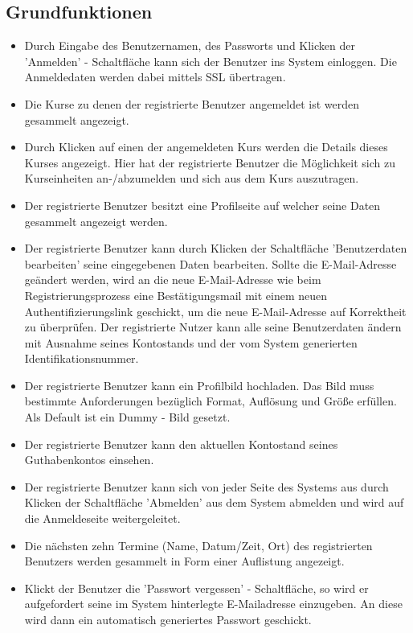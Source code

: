 \documentclass[a4paper]{scrreprt}
\begin{document}
		\subsection{Grundfunktionen}
			\begin{itemize}
				\item {}
					Durch Eingabe des Benutzernamen, des Passworts und Klicken der 'Anmelden' - Schaltfläche kann sich der Benutzer ins System einloggen. Die Anmeldedaten werden dabei mittels SSL übertragen.
				\item {}
					Die Kurse zu denen der registrierte Benutzer angemeldet ist werden gesammelt angezeigt.
				\item {}
					Durch Klicken auf einen der angemeldeten Kurs werden die Details dieses Kurses angezeigt. Hier hat der registrierte Benutzer die Möglichkeit sich zu Kurseinheiten an-/abzumelden und sich aus dem Kurs auszutragen.
				\item {}
					Der registrierte Benutzer besitzt eine Profilseite auf welcher seine Daten gesammelt angezeigt werden. 
				\item {}
					Der registrierte Benutzer kann durch Klicken der Schaltfläche 'Benutzerdaten bearbeiten' seine eingegebenen Daten bearbeiten. Sollte die E-Mail-Adresse geändert werden, wird an die neue E-Mail-Adresse wie beim Registrierungsprozess eine Bestätigungsmail mit einem neuen Authentifizierungslink geschickt, um die neue E-Mail-Adresse auf Korrektheit zu überprüfen.
					Der registrierte Nutzer kann alle seine Benutzerdaten ändern mit Ausnahme seines Kontostands und der vom System generierten Identifikationsnummer.
				\item {}
					Der registrierte Benutzer kann ein Profilbild hochladen. Das Bild muss bestimmte Anforderungen bezüglich Format, Auflösung und Größe erfüllen. Als Default ist ein Dummy - Bild gesetzt.
				\item {}
					Der registrierte Benutzer kann den aktuellen Kontostand seines Guthabenkontos einsehen. 
				\item {}
					Der registrierte Benutzer kann sich  von jeder Seite des Systems aus durch Klicken der Schaltfläche 'Abmelden' aus dem System abmelden und wird auf die Anmeldeseite weitergeleitet.
				\item {}
					Die nächsten zehn Termine (Name, Datum/Zeit, Ort) des registrierten Benutzers werden gesammelt in Form einer Auflistung angezeigt.
				\item {}
					Klickt der Benutzer die 'Passwort vergessen' - Schaltfläche, so wird er aufgefordert seine im System hinterlegte E-Mailadresse einzugeben. An diese wird dann ein automatisch generiertes Passwort geschickt.
			\end{itemize}	
				
\end{document}
